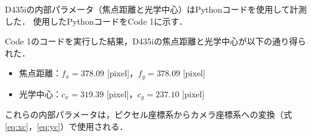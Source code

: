 D435iの内部パラメータ（焦点距離と光学中心）はPythonコードを使用して計測した．
使用したPythonコードをCode 1に示す．

Code 1のコードを実行した結果，D435iの焦点距離と光学中心が以下の通り得られた．

\begin{itemize}
  \item 焦点距離：$f_x = 378.09$ [pixel]，$f_y = 378.09$ [pixel]
  \item 光学中心：$c_x = 319.39$ [pixel]，$c_y = 237.10$ [pixel]
\end{itemize}

これらの内部パラメータは，ピクセル座標系からカメラ座標系への変換（式\eqref{eq:xc}，\eqref{eq:yc}）で使用される．


